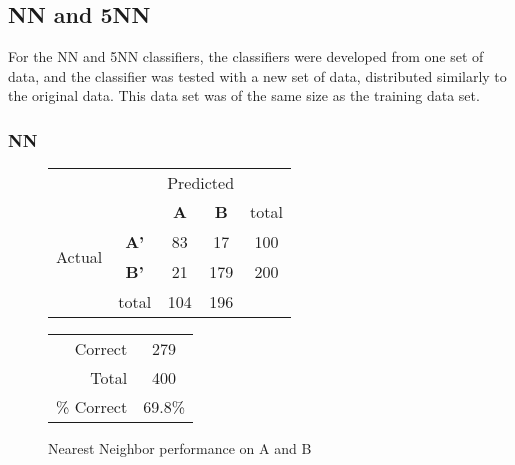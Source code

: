 \clearpage

\subsection{NN and 5NN}

For the NN and 5NN classifiers, the classifiers were developed from one set of data, and the classifier was tested with a new set of data, distributed similarly to the original data. This data set was of the same size as the training data set.

\subsubsection{NN}
\begin{figure}[!ht]
\begin{minipage}[b]{0.5\linewidth}
\centering
	\begin{tabular}{ccc|c|c}
	 & &\multicolumn{2}{c}{Predicted} &\\
	  & & \bf{A} &  \bf{B} & total \\
	 \cline{3-5}
	 \multirow{2}{*}{\begin{sideways}Actual\end{sideways}} & \bf{A'}& 83 & 17 & 100 \\
	 \cline{3-5}
	 & \bf{B'}& 21 & 179 & 200 \\
	  \cline{3-5}
	 &total&104&196&\\
	\end{tabular}
\end{minipage}
\hspace{0.5cm}
\begin{minipage}[b]{0.5\linewidth}
	\begin{tabular}{r|c}
	\hline
	Correct& 279\\
	Total& 400\\
	\hline
	\% Correct& 69.8\%\\
	\hline
	\end{tabular}
\end{minipage}
\vspace{1mm}
\caption{Nearest Neighbor performance on A and B}
\end{figure}


